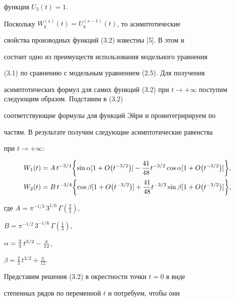 функция $U_3 (t)=1$.





Поскольку $W_k^{(s)} (t) = U_k^{(s-1)} (t)$, то асимптотические


свойства производных функций (3.2) известны [5]. В этом и


состоит одно из преимуществ использования модельного уравнения


(3.1) по сравнению с модельным уравнением (2.5). Для получения


асимптотических формул для самих функций (3.2) при $ t \rightarrow


+ \infty $ поступим следующим образом. Подставим в (3.2)


соответствующие формулы для функций Эйри и проинтегририруем по


частям. В результате получим следующие асимптотические равенства


при $t \rightarrow + \infty$:


\begin{align*}


W_1 (t) &= A \,t^{{-3}/{4}} \biggl\{ \sin \aa [1 + O \bigl(t ^


{-3/2} \bigr) ] - \frac{41}{48} t^{{-3}/{2}} \cos \aa [1 +


O \bigl(t^{{-3}/{2}} \bigr) ] \biggr\},\\


%


W_2 (t) &= B\, t^{{-3}/{4}} \biggl\{ \cos \beta [1 + O \bigl(t^{-3/2}


\bigr) ] + \frac{41}{48} t^{{-3}/{2}} \sin \beta [1 +


O \bigl(t^{{-3}/{2}} \bigr) ] \biggr\},


\end{align*}


где $A = \pi^{{-1}/{2}}\, 3^{{1}/{6}}\, \Gamma \left(\frac{2}{3} \right)$,


$B = \pi^{{-1}/{2}}\, 3^{{-1}/{6}}\, \Gamma \left(\frac{1}{3} \right)$,


$\aa = \frac{2}{3}\, t^{{3}/{2}}-\frac{\pi}{12}$,


$\beta = \frac{2}{3}\, t^{{3}/{2}}+\frac{\pi}{12}$.





Представим решения (3.2) в окрестности точки $t = 0$ в виде


степенных рядов по переменной $t$ и потребуем, чтобы они


